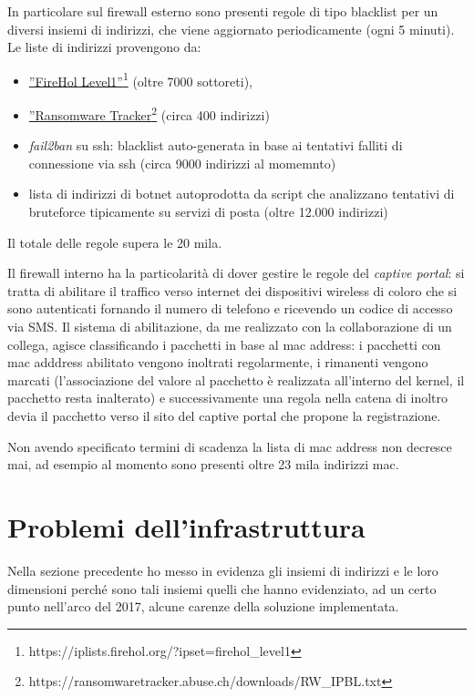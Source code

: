 In particolare sul firewall esterno sono presenti regole di tipo blacklist per
un diversi insiemi di indirizzi, che viene aggiornato
periodicamente (ogni 5 minuti).  Le liste di indirizzi provengono da:

\begin{itemize}
    \item \href{https://iplists.firehol.org/?ipset=firehol\_level1}{''FireHol
	Level1''}\footnote{https://iplists.firehol.org/?ipset=firehol\_level1} (oltre
	7000 sottoreti),
    \item \href{https://ransomwaretracker.abuse.ch/downloads/RW\_IPBL.txt}{''Ransomware
	Tracker}\footnote{https://ransomwaretracker.abuse.ch/downloads/RW\_IPBL.txt}
	(circa 400 indirizzi)
    \item {\em fail2ban} su ssh: blacklist auto-generata in base ai tentativi
	falliti di connessione via ssh (circa 9000 indirizzi al momemnto)
    \item lista di indirizzi di botnet autoprodotta da script che analizzano
	tentativi di bruteforce tipicamente su servizi di posta (oltre 12.000
	indirizzi)
\end{itemize}
 
\noindent Il totale delle regole supera le 20 mila.

Il firewall interno ha la particolarità di dover gestire le regole del {\em
captive portal}: si tratta di abilitare il traffico verso internet dei
dispositivi wireless di coloro che si sono autenticati fornando il numero di
telefono e ricevendo un codice di accesso via SMS.  Il sistema di
abilitazione, da me realizzato con la collaborazione di un collega, agisce
classificando i pacchetti in base al mac address: i pacchetti con mac adddress
abilitato vengono inoltrati regolarmente, i rimanenti vengono marcati
(l'associazione del valore al pacchetto è realizzata all'interno del kernel,
il pacchetto resta inalterato) e successivamente una regola nella catena di
inoltro devia il pacchetto verso il sito del captive portal che propone la
registrazione.

Non avendo specificato termini di scadenza la lista di mac address non
decresce mai, ad esempio al momento sono presenti oltre 23 mila indirizzi mac.

\section{Problemi dell'infrastruttura}

Nella sezione precedente ho messo in evidenza gli insiemi di indirizzi e le
loro dimensioni perché sono tali insiemi quelli che hanno evidenziato, ad un
certo punto nell'arco del 2017, alcune carenze della soluzione implementata.

